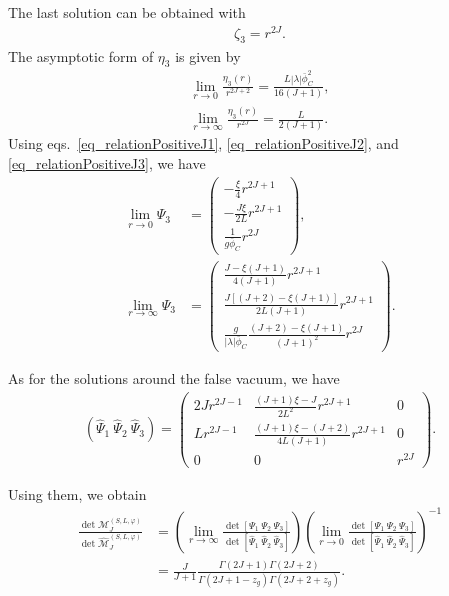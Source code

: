 \documentclass[12pt]{article}
\begin{document}
The last solution can be obtained with
\begin{align}
 \zeta_3 = r^{2J}.
\end{align}
The asymptotic form of $\eta_3$ is given by
\begin{align}
 \lim_{r\to0}\frac{\eta_3(r)}{r^{2J+2}} = \frac{L|\lambda|\bar\phi_C^2}{16(J+1)}, \\
 \lim_{r\to\infty}\frac{\eta_3(r)}{r^{2J}} = \frac{L}{2(J+1)}.
\end{align}
Using eqs.~\eqref{eq_relationPositiveJ1}, \eqref{eq_relationPositiveJ2},
and \eqref{eq_relationPositiveJ3}, we have
\begin{align}
 \lim_{r\to0}\Psi_3      & =
 \begin{pmatrix}
  -\frac{\xi}{4}r^{2J+1}   \\
  -\frac{J\xi}{2L}r^{2J+1} \\
  \frac{1}{g\bar\phi_C}r^{2J}
 \end{pmatrix}, \\
 \lim_{r\to\infty}\Psi_3 & =
 \begin{pmatrix}
  \frac{J-\xi(J+1)}{4(J+1)}r^{2J+1}         \\
  \frac{J[(J+2)-\xi(J+1)]}{2L(J+1)}r^{2J+1} \\
  \frac{g}{|\lambda|\bar\phi_C}\frac{(J+2)-\xi(J+1)}{(J+1)^2}r^{2J}
 \end{pmatrix}.
\end{align}

As for the solutions around the false vacuum, we have
\begin{align}
 (\hat\Psi_1~\hat\Psi_2~\hat\Psi_3)=
 \begin{pmatrix}
  2Jr^{2J-1} & \frac{(J+1)\xi-J}{2L^2}r^{2J+1}        & 0      \\
  Lr^{2J-1}  & \frac{(J+1)\xi-(J+2)}{4L(J+1)}r^{2J+1} & 0      \\
  0          & 0                                      & r^{2J}
 \end{pmatrix}.
\end{align}

Using them, we obtain
\begin{align}
 \frac{\det\mathcal M^{(S,L,\varphi)}_J}{\det\widehat{\mathcal M}^{(S,L,\varphi)}_J}
  & =
 \left(
  \lim_{r\to\infty}\frac{\det[\Psi_1~\Psi_2~\Psi_3]}{\det[\hat\Psi_1~\hat\Psi_2~\hat\Psi_3]}
 \right)
 \left(
  \lim_{r\to0}\frac{\det[\Psi_1~\Psi_2~\Psi_3]}{\det[\hat\Psi_1~\hat\Psi_2~\hat\Psi_3]}
 \right)^{-1}\nonumber                                                                    \\
  & = \frac{J}{J+1}\frac{\Gamma(2J+1)\Gamma(2J+2)}{\Gamma(2J+1-z_g)\Gamma(2J+2+z_g)}.
\end{align}
\end{document}
